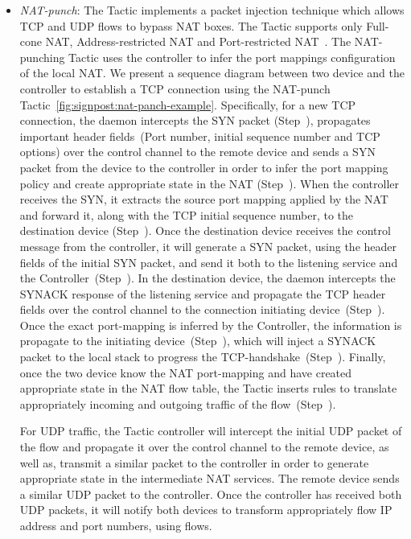 \begin{itemize}
  \item \emph{NAT-punch}: The Tactic implements a packet injection technique which
    allows TCP and UDP flows to bypass NAT boxes. The Tactic supports only
    Full-cone NAT, Address-restricted NAT and Port-restricted
    NAT~\cite{RFC3489}.  The NAT-punching Tactic uses the \signpost controller to infer
    the port mappings configuration of the local NAT\@. We present a sequence
    diagram between two device and the \signpost controller to establish a TCP
    connection using the NAT-punch Tactic~\ref{fig:signpost:nat-panch-example}.
    Specifically, for a new TCP connection, the daemon intercepts the SYN packet
    (Step~), propagates important header fields~(Port number, initial
    sequence number and TCP options) over the control channel to the remote
    device and sends a SYN packet from the device to the \signpost controller in
    order to infer the port mapping policy and create appropriate state in the
    NAT (Step~). When the \signpost controller receives the SYN, it
    extracts the source port mapping applied by the NAT and forward it, along
    with the TCP initial sequence number, to the destination device
    (Step~).  Once the destination device receives the control message
    from the \signpost controller, it will generate a SYN packet, using the header fields
    of the initial SYN packet, and send it both to the listening service and the
    \signpost Controller~(Step~). In the destination device, the
    \signpost daemon intercepts the SYNACK response of the listening service and
    propagate the TCP header fields over the control channel to the connection
    initiating device~(Step~).  Once the exact port-mapping is
    inferred by the Controller, the information is propagate to the initiating
    device~(Step~), which will inject a SYNACK packet to the local
    stack to progress the TCP-handshake~(Step~). Finally, once the two
    device know the NAT port-mapping and have created appropriate state in the
    NAT flow table, the Tactic inserts \of rules to translate appropriately
    incoming and outgoing traffic of the flow~(Step~).

    For UDP traffic, the Tactic controller will intercept the initial UDP packet
    of the flow and propagate it over the control channel to the remote device,
    as well as, transmit a similar packet to the \signpost controller in order
    to generate appropriate state in the intermediate NAT services. The remote
    device sends a similar UDP packet to the \signpost controller. Once the
    controller has received both UDP packets, it will notify both devices to
    transform appropriately flow IP address and port numbers, using \of flows. 
\end{itemize}

